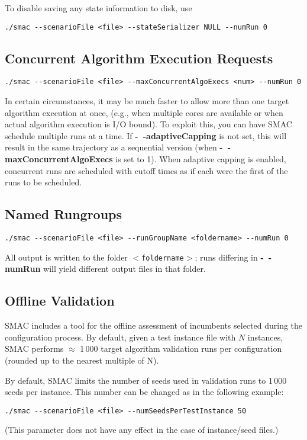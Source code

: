 To disable saving any state information to disk, use 
\begin{verbatim}
./smac --scenarioFile <file> --stateSerializer NULL --numRun 0
\end{verbatim}


\subsection{Concurrent Algorithm Execution Requests}
\begin{verbatim}
./smac --scenarioFile <file> --maxConcurrentAlgoExecs <num> --numRun 0
\end{verbatim}

In certain circumstances, it may be much faster to allow more than one target algorithm execution at once,
(e.g., when multiple cores are available or when actual algorithm execution is I/O bound). 
To exploit this, you can have SMAC schedule multiple runs at a time. If \textbf{-~$\!$-adaptiveCapping} is not set, this will result in the same trajectory as a sequential version (when \textbf{-~$\!$-maxConcurrentAlgoExecs} is set to 1). When adaptive capping is enabled, concurrent runs are scheduled with cutoff times as if each were the first of the runs to be scheduled.


\subsection{Named Rungroups}
\begin{verbatim}
./smac --scenarioFile <file> --runGroupName <foldername> --numRun 0
\end{verbatim}
All output is written to the folder \texttt{$<$foldername$>$}; runs differing in \textbf{-~$\!$-numRun} will yield different output files in that folder.


\subsection{Offline Validation}

SMAC includes a tool for the offline assessment of incumbents selected during the configuration process.
By default, given a test instance file with $N$ instances, SMAC performs $\approx$ 1\,000 target algorithm validation runs per configuration (rounded up to the nearest multiple of N).

By default, SMAC limits the number of seeds used in validation runs to 1\,000 seeds per instance. This number can be changed as in the following example:
\begin{verbatim}
./smac --scenarioFile <file> --numSeedsPerTestInstance 50
\end{verbatim}
(This parameter does not have any effect in the case of instance/seed files.)



